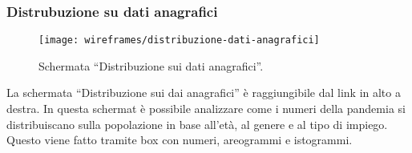 \subsubsection{Distrubuzione su dati anagrafici}\label{ss:distribuzione-su-dati-anagrafici}
\begin{figure}[H]
    \centering
    \texttt{[image: wireframes/distribuzione-dati-anagrafici]}
    \caption{Schermata ``Distribuzione sui dati anagrafici''.}\label{fig:distribuzione-dati-anagrafici}
\end{figure}
La schermata ``Distribuzione sui dai anagrafici'' è raggiungibile dal link in alto a destra. In questa schermat è possibile analizzare come i numeri della pandemia si distribuiscano sulla popolazione in base all'età, al genere e al tipo di impiego. Questo viene fatto tramite box con numeri, areogrammi e istogrammi.

